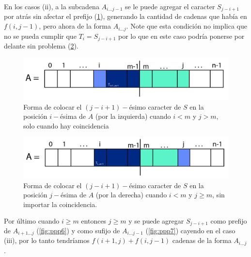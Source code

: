 \documentclass[a4paper]{article}
\begin{document}
    En los casos (ii), a la subcadena $A_{i...j-1}$ se le puede agregar el caracter $S_{j-i+1}$ por atr\'as sin afectar 
    el prefijo (\ref{fig:ppp5a}), generando la cantidad de cadenas que hab\'ia en $f(i,j-1)$, pero ahora de la forma $A_{i...j}$. Note que esta condición no implica que no se pueda cumplir que $T_{i} =  S_{j-i+1}$ por lo que en este caso podría ponerse por delante sin problema (\ref{fig:ppp5}).\\
    
    \begin{figure}[h!]
    	\centering
    	\includegraphics[width=0.7\linewidth]{ppp5}
    	\caption{Forma de colocar el $(j-i+1)-$ésimo caracter de $S$ en la posición $i-$ésima de $A$ (por la izquierda) cuando $i < m$ y $j > m$, solo cuando hay coincidencia}
    	\label{fig:ppp5a}
    \end{figure}

	\begin{figure}[h!]
		\centering
		\includegraphics[width=0.7\linewidth]{ppp5a}
		\caption{Forma de colocar el $(j-i+1)-$ésimo caracter de $S$ en la posición $j-$ésima de $A$ (por la derecha) cuando $i < m$ y $j \ge m$, sin importar la coincidencia.}
		\label{fig:ppp5}
	\end{figure}
    
    
    Por \'ultimo cuando $i \geq m$ entonces $j \geq m$ y se puede agregar $S_{j-i+1}$ como prefijo de 
    $A_{i+1...j}$ (\ref{fig:ppp6}) y como sufijo de $A_{i...j-1}$ (\ref{fig:ppp7}) cayendo en el caso (iii), por lo tanto tendr\'iamos $f(i+1,j) + f(i,j-1)$ cadenas de la forma $A_{i...j}$.
    
\end{document}
